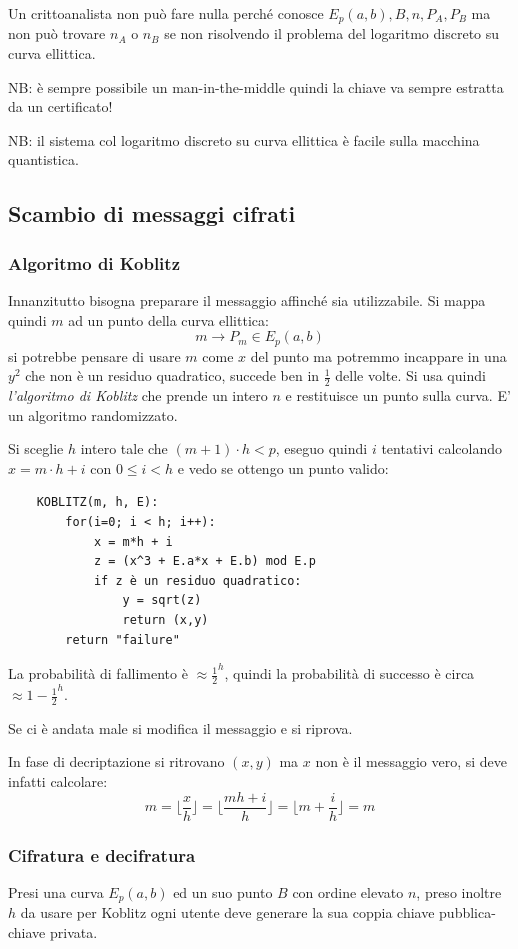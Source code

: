 Un crittoanalista non può fare nulla perché conosce $E_p(a,b), B, n, P_A, P_B$ ma non può trovare $n_A$ o $n_B$ se non risolvendo il problema del logaritmo discreto su curva ellittica.

NB: è sempre possibile un man-in-the-middle quindi la chiave va sempre estratta da un certificato!

NB: il sistema col logaritmo discreto su curva ellittica è facile sulla macchina quantistica.

\subsection{Scambio di messaggi cifrati}

\subsubsection{Algoritmo di Koblitz}
Innanzitutto bisogna preparare il messaggio affinché sia utilizzabile.
Si mappa quindi $m$ ad un punto della curva ellittica:
$$ m \xrightarrow{} P_m \in E_p(a,b) $$
si potrebbe pensare di usare $m$ come $x$ del punto ma potremmo incappare in una $y^2$ che non è un residuo quadratico, succede ben in $\frac{1}{2}$ delle volte.
Si usa quindi \emph{l'algoritmo di Koblitz} che prende un intero $n$ e restituisce un punto sulla curva.
E' un algoritmo randomizzato.

Si sceglie $h$ intero tale che $(m + 1) \cdot h < p$, eseguo quindi $i$ tentativi calcolando $x = m \cdot h + i$ con $0 \leq i < h$ e vedo se ottengo un punto valido:

\begin{verbatim}
    KOBLITZ(m, h, E):
        for(i=0; i < h; i++):
            x = m*h + i
            z = (x^3 + E.a*x + E.b) mod E.p
            if z è un residuo quadratico:
                y = sqrt(z)
                return (x,y)
        return "failure"
\end{verbatim}

La probabilità di fallimento è $\approx \frac{1}{2}^h$, quindi la probabilità di successo è circa $\approx 1 - \frac{1}{2}^h$.

Se ci è andata male si modifica il messaggio e si riprova.

In fase di decriptazione si ritrovano $(x,y)$ ma $x$ non è il messaggio vero, si deve infatti calcolare:
$$ m = \lfloor \frac{x}{h} \rfloor = \lfloor \frac{mh+i}{h} \rfloor = \lfloor m + \frac{i}{h} \rfloor = m $$

\subsubsection{Cifratura e decifratura}
Presi una curva $E_p(a,b)$ ed un suo punto $B$ con ordine elevato $n$, preso inoltre $h$ da usare per Koblitz ogni utente deve generare la sua coppia chiave pubblica-chiave privata.

